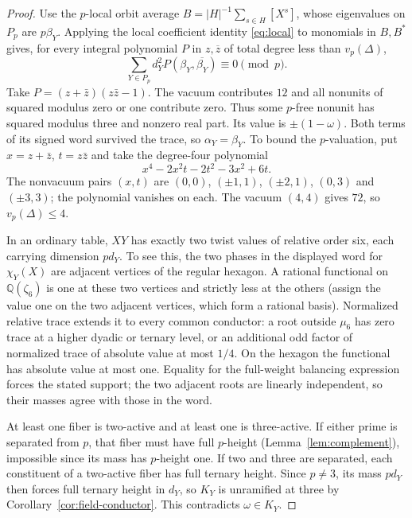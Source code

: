 \documentclass[11pt,a4paper]{article}
\numberwithin{equation}{section}
\theoremstyle{remark}
\newcommand{\QQ}{\mathbb Q}
\begin{document}
\begin{proof}
Use the $p$-local orbit average $B=|H|^{-1}\sum_{s\in H}[X^s]$, whose
eigenvalues on $P_p$ are $p\beta_Y$. Applying the local coefficient
identity \eqref{eq:local} to monomials in $B,B^*$ gives, for every integral
polynomial $P$ in $z,\overline z$ of total degree less than
$v_p(\Delta)$,
\[
  \sum_{Y\in P_p}d_Y^2 P(\beta_Y,\overline{\beta_Y})\equiv0
  \pmod p .
\]
Take $P=(z+\bar z)(z\bar z-1)$. The vacuum contributes $12$ and all
nonunits of squared modulus zero or one contribute zero. Thus some
$p$-free nonunit has squared modulus three and nonzero real part.
Its value is $\pm(1-\omega)$. Both terms of its signed word survived
the trace, so $\alpha_Y=\beta_Y$. To bound the $p$-valuation, put
$x=z+\bar z$, $t=z\bar z$ and take the degree-four polynomial
\[
   x^4-2x^2t-2t^2-3x^2+6t .
\]
The nonvacuum pairs $(x,t)$ are $(0,0)$, $(\pm1,1)$, $(\pm2,1)$,
$(0,3)$ and $(\pm3,3)$; the polynomial vanishes on each. The vacuum
$(4,4)$ gives $72$, so $v_p(\Delta)\le4$.

In an ordinary table, $XY$ has exactly two twist values of relative
order six, each carrying dimension $p d_Y$. To see this, the two phases
in the displayed word for $\chi_Y(X)$ are adjacent vertices of the
regular hexagon. A rational functional on $\QQ(\zeta_6)$ is one at
these two vertices and strictly less at the others (assign the value
one on the two adjacent vertices, which form a rational basis).
Normalized relative trace extends it to every common conductor:
a root outside $\mu_6$ has zero trace at a higher dyadic or ternary
level, or an additional odd factor of normalized trace of absolute
value at most $1/4$. On the hexagon the functional has absolute value
at most one. Equality for the full-weight balancing expression forces
the stated support; the two adjacent roots are linearly independent,
so their masses agree with those in the word.

At least one fiber is two-active and at least one is three-active.
If either prime is separated from $p$, that fiber must have full $p$-height (Lemma~\ref{lem:complement}), impossible since its mass has $p$-height
one. If two and three are separated, each constituent of a two-active
fiber has full ternary height. Since $p\ne3$, its mass $p d_Y$
then forces full ternary height in $d_Y$, so $K_Y$ is unramified at
three by Corollary~\ref{cor:field-conductor}. This contradicts $\omega\in K_Y$.
\end{proof}
\end{document}
